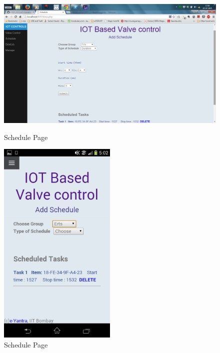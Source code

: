 \documentclass[16pt]{article}
\begin{document}
	\begin{figure}
		\includegraphics[width=1\textwidth]{images/schedule.png}
		\caption{Schedule Page}
		\includegraphics[width=0.5\textwidth]{images/schedule_page.png}
		\caption{Schedule Page}
	\end{figure}
\end{document}
